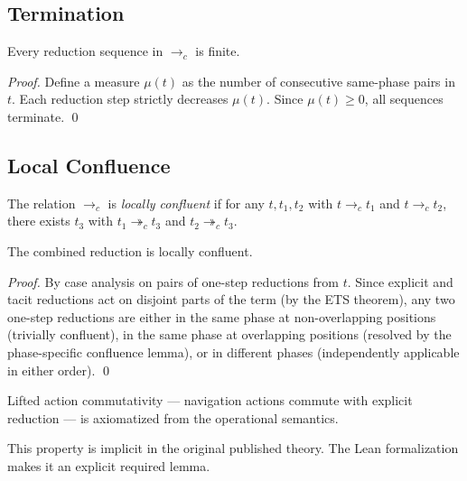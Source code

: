 \subsection{Termination}

\begin{theorem}[Termination]
Every reduction sequence in $\to_c$ is finite.
\end{theorem}
\begin{proof}
Define a measure $\mu(t)$ as the number of consecutive same-phase pairs in $t$.
Each reduction step strictly decreases $\mu(t)$. Since $\mu(t) \geq 0$, all
sequences terminate. \qed
\end{proof}

\subsection{Local Confluence}

\begin{definition}
The relation $\to_c$ is \emph{locally confluent} if for any $t, t_1, t_2$ with
$t \to_c t_1$ and $t \to_c t_2$, there exists $t_3$ with
$t_1 \twoheadrightarrow_c t_3$ and $t_2 \twoheadrightarrow_c t_3$.
\end{definition}

\begin{theorem}
The combined reduction is locally confluent.
\end{theorem}
\begin{proof}
By case analysis on pairs of one-step reductions from $t$. Since explicit and
tacit reductions act on disjoint parts of the term (by the ETS theorem), any two
one-step reductions are either in the same phase at non-overlapping positions
(trivially confluent), in the same phase at overlapping positions (resolved by the
phase-specific confluence lemma), or in different phases (independently applicable
in either order). \qed
\end{proof}

\begin{note}
Lifted action commutativity --- navigation actions commute with explicit reduction
--- is axiomatized from the operational semantics.

This property is implicit in the original published theory. The Lean formalization
makes it an explicit required lemma.
\end{note}

